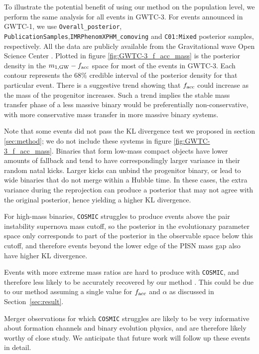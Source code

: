 \documentclass[twocolumn]{aastex631}
\begin{document}
To illustrate the potential benefit of using our method on the population level,
we perform the same analysis for all events in GWTC-3.
For events announced in GWTC-1, we use \texttt{Overall\_posterior}, \texttt{PublicationSamples},\texttt{IMRPhenomXPHM\_comoving} and \texttt{C01:Mixed} posterior samples, respectively.
All the data are publicly available from the Gravitational wave Open Science Center \citep{LIGOScientific:2019lzm}.
Plotted in figure
\ref{fig:GWTC-3_f_acc_mass} is the posterior density in the $m_{1,{\rm
GW}}-f_{\rm acc}$ space for most of the events in GWTC-3.
Each contour represents
the $68\%$ credible interval of the posterior density for that particular event.
There is a suggestive trend showing that $f_{\rm acc}$ could increase as the mass of
the progenitor increases. Such a trend implies the stable mass transfer
phase of a less massive binary would be preferentially non-conservative, with
more conservative mass transfer in more massive binary systems.

Note that some events did not pass the KL divergence test we proposed in section
\ref{sec:method}; we do not include these systems in figure
\ref{fig:GWTC-3_f_acc_mass}. Binaries that form low-mass compact objects have
lower amounts of fallback and tend to have correspondingly larger variance in
their random natal kicks. Larger kicks can unbind the progenitor binary, or lead
to wide binaries that do not merge within a Hubble time.  In these cases, the
extra variance during the reprojection can produce a posterior that may not
agree with the original posterior, hence yielding a higher KL divergence.

For high-mass binaries, \texttt{COSMIC} struggles to produce events above the
pair instability supernova mass cutoff, so the posterior in the
evolutionary parameter space only corresponds to part of the posterior in the
observable space below this cutoff, and therefore events beyond the lower edge of the PISN mass
gap also have higher KL divergence.

Events with more extreme mass ratios are hard to produce with \texttt{COSMIC},
and therefore less likely to be accurately recovered by our method \citep[e.g.][]{Zevin2020}. This could
be due to our method assuming a single value for $f_{\rm acc}$ and $\alpha$ as
discussed in Section~\ref{sec:result}.

Merger observations for which \texttt{COSMIC} struggles are likely to be very
informative about formation channels and binary evolution physics, and are
therefore likely worthy of close study.  We anticipate that future work will
follow up these events in detail.
\end{document}

